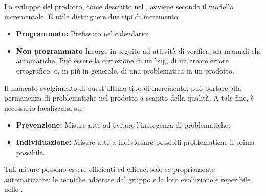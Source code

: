 Lo sviluppo del prodotto, come descritto nel \PdP , avviene secondo il modello incrementale. \'E utile distinguere due tipi di incremento:
\begin{itemize}
	\item \textbf{Programmato:} Prefissato nel calendario;
	\item \textbf{Non programmato} Insorge in seguito ad attività di verifica, sia manuali che automatiche. Può essere la correzione di un bug, di un errore errore ortografico, o, in più in generale, di una problematica in un prodotto.
\end{itemize}
Il mancato svolgimento di quest'ultimo tipo di incremento, può portare alla permanenza di problematiche nel prodotto a scapito della qualità. A tale fine, è necessario focalizzarsi su:
\begin{itemize}
	\item \textbf{Prevenzione:} Misure atte ad evitare l'insorgenza di problematiche;
	\item \textbf{Individuazione:} Misure atte a individuare possibili problematiche il prima possibile.
\end{itemize}
Tali misure possono essere efficienti ed efficaci solo se propriamente automatizzate: le tecniche adottate dal gruppo \gruppo \space e la loro evoluzione è reperibile nelle \NdP . 
 
